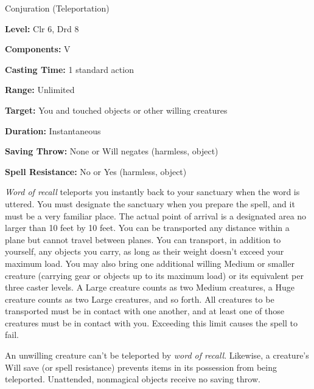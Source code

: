 
Conjuration (Teleportation)

\textbf{Level:} Clr 6, Drd 8

\textbf{Components:} V

\textbf{Casting Time:} 1 standard action

\textbf{Range:} Unlimited

\textbf{Target:} You and touched objects or other willing creatures

\textbf{Duration:} Instantaneous

\textbf{Saving Throw:} None or Will negates (harmless, object)

\textbf{Spell Resistance:} No or Yes (harmless, object)

\textit{Word of recall} teleports you instantly back to your sanctuary when the 
word is uttered. You must designate the sanctuary when you prepare the spell, and 
it must be a very familiar place. The actual point of arrival is a designated area 
no larger than 10 feet by 10 feet. You can be transported any distance within a 
plane but cannot travel between planes. You can transport, in addition to yourself, 
any objects you carry, as long as their weight doesn't exceed your maximum load. 
You may also bring one additional willing Medium or smaller creature (carrying 
gear or objects up to its maximum load) or its equivalent per three caster levels. 
A Large creature counts as two Medium creatures, a Huge creature counts as two 
Large creatures, and so forth. All creatures to be transported must be in contact 
with one another, and at least one of those creatures must be in contact with you. 
Exceeding this limit causes the spell to fail.

An unwilling creature can't be teleported by \textit{word of recall}. Likewise, 
a creature's Will save (or spell resistance) prevents items in its possession from 
being teleported. Unattended, nonmagical objects receive no saving throw.

